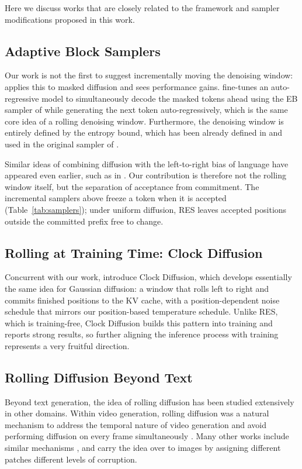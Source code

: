 Here we discuss works that are closely related to the framework and sampler modifications proposed in this work.

\subsection{Adaptive Block Samplers}
Our work is not the first to suggest incrementally moving the denoising window: \citet{luo2026dsb} applies this to masked diffusion and sees performance gains.
\citet{gat2025set} fine-tunes an auto-regressive model to simultaneously decode the masked tokens ahead using the EB sampler of \citet{ben2026accelerated} while generating the next token auto-regressively, which is the same core idea of a rolling denoising window.
Furthermore, the denoising window is entirely defined by the entropy bound, which has been already defined in \citet{ben2026accelerated} and used in the original sampler of \citet{team2026diffusiongemma}.

Similar ideas of combining diffusion with the left-to-right bias of language have appeared even earlier, such as in \citep{wu2023ar}.
Our contribution is therefore not the rolling window itself, but the separation of acceptance from commitment.
The incremental samplers above freeze a token when it is accepted (Table~\ref{tab:samplers}); under uniform diffusion, RES leaves accepted positions outside the committed prefix free to change.

\subsection{Rolling at Training Time: Clock Diffusion}
Concurrent with our work, \citet{schiff2026clock} introduce Clock Diffusion, which develops essentially the same idea for Gaussian diffusion: a window that rolls left to right and commits finished positions to the KV cache, with a position-dependent noise schedule that mirrors our position-based temperature schedule.
Unlike RES, which is training-free, Clock Diffusion builds this pattern into training and reports strong results, so further aligning the inference process with training represents a very fruitful direction.

\subsection{Rolling Diffusion Beyond Text}
Beyond text generation, the idea of rolling diffusion has been studied extensively in other domains.
Within video generation, rolling diffusion was a natural mechanism to address the temporal nature of video generation and avoid performing diffusion on every frame simultaneously \citep{ruhe2024rolling}. 
Many other works include similar mechanisms \citep{chen2024diffusion, song2025history, xie2025progressive}, and \citet{papa2026asyncpatch} carry the idea over to images by assigning different patches different levels of corruption.
